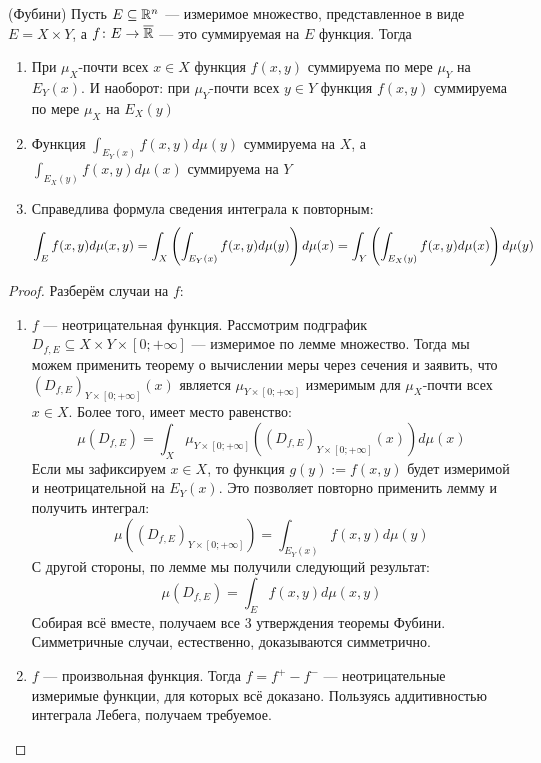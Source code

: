 \begin{theorem} (Фубини)
	Пусть $E \subseteq \mathbb{R}^n$ --- измеримое множество, представленное в виде $E = X \times Y$, а $f \colon E \to \overline{\mathbb{R}}$ --- это суммируемая на $E$ функция. Тогда
	\begin{enumerate}
		\item При $\mu_X$-почти всех $x \in X$ функция $f(x, y)$ суммируема по мере $\mu_Y$ на $E_Y(x)$. И наоборот: при $\mu_Y$-почти всех $y \in Y$ функция $f(x, y)$ суммируема по мере $\mu_X$ на $E_X(y)$
		
		\item Функция $\int_{E_Y(x)} f(x, y)d\mu(y)$ суммируема на $X$, а $\int_{E_X(y)} f(x, y)d\mu(x)$ суммируема на $Y$
		
		\item Справедлива формула сведения интеграла к повторным:
		\[
			\int_E f(x, y)d\mu(x, y) = \int_X \left(\int_{E_Y(x)} f(x, y)d\mu(y)\right)d\mu(x) = \int_Y \left(\int_{E_X(y)} f(x, y)d\mu(x)\right)d\mu(y)
		\]
	\end{enumerate}
\end{theorem}

\begin{proof}
	Разберём случаи на $f$:
	\begin{enumerate}
		\item $f$ --- неотрицательная функция. Рассмотрим подграфик $D_{f, E} \subseteq X \times Y \times [0; +\infty]$ --- измеримое по лемме множество. Тогда мы можем применить теорему о вычислении меры через сечения и заявить, что $(D_{f, E})_{Y \times [0; +\infty]}(x)$ является $\mu_{Y \times [0; +\infty]}$ измеримым для $\mu_X$-почти всех $x \in X$. Более того, имеет место равенство:
		\[
			\mu(D_{f, E}) = \int_X \mu_{Y \times [0; +\infty]}((D_{f, E})_{Y \times [0; +\infty]}(x))d\mu(x)
		\]
		Если мы зафиксируем $x \in X$, то функция $g(y) := f(x, y)$ будет измеримой и неотрицательной на $E_Y(x)$. Это позволяет повторно применить лемму и получить интеграл:
		\[
			\mu((D_{f, E})_{Y \times [0; +\infty]}) = \int_{E_Y(x)} f(x, y) d\mu(y)
		\]
		С другой стороны, по лемме мы получили следующий результат:
		\[
			\mu(D_{f, E}) = \int_E f(x, y)d\mu(x, y)
		\]
		Собирая всё вместе, получаем все 3 утверждения теоремы Фубини. Симметричные случаи, естественно, доказываются симметрично.
		
		\item $f$ --- произвольная функция. Тогда $f = f^+ - f^-$ --- неотрицательные измеримые функции, для которых всё доказано. Пользуясь аддитивностью интеграла Лебега, получаем требуемое.
	\end{enumerate}
\end{proof}

